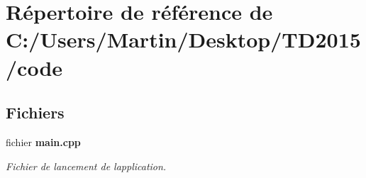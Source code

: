 \section{Répertoire de référence de C\+:/\+Users/\+Martin/\+Desktop/\+T\+D2015/code}
\label{dir_050edd66366d13764f98250ef6db77f6}
\subsection*{Fichiers}
\begin{DoxyCompactItemize}
\item 
fichier {\bf main.\+cpp}
\begin{DoxyCompactList}\small\item\em Fichier de lancement de l\textquotesingle{}application. \end{DoxyCompactList}\end{DoxyCompactItemize}
